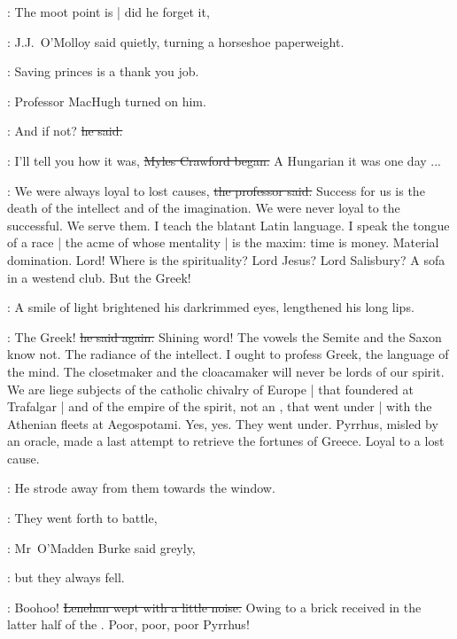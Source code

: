 \jjom:
The moot point is |
did he forget it,

:
J.J.~O'Molloy said quietly,
turning a horseshoe paperweight.

\jjom:
Saving princes is a thank you job.


:
Professor MacHugh turned on him.

\machugh:
And if not?
\sout{he said.}

\crawford:
I'll tell you how it was,
\sout{Myles Crawford began.}
A Hungarian it was one day
...



\machugh:
We were always loyal to lost causes,
\sout{the professor said.}
Success for us is the death of the intellect and of the imagination.
We were never loyal to the successful.
We serve them.
I teach the blatant Latin language.
I speak the tongue of a race |
the acme of whose mentality |
is the maxim:
time is money.
Material domination.
Lord!
Where is the spirituality?
Lord Jesus?
Lord Salisbury?
A sofa in a westend club.
But the Greek!



:
A smile of light brightened his darkrimmed eyes,
lengthened his long lips.

\machugh:
The Greek!
\sout{he said again.}
Shining word!
The vowels the Semite and the Saxon know not.
The radiance of the intellect.
I ought to profess Greek, the language of the mind.
The closetmaker and the cloacamaker will never be lords of our spirit.
We are liege subjects of the catholic chivalry of Europe |
that foundered at Trafalgar |
and of the empire of the spirit,
not an ,
that went under |
with the Athenian fleets at Aegospotami.
Yes, yes.
They went under.
Pyrrhus,
misled by an oracle,
made a last attempt to retrieve the fortunes of Greece.
Loyal to a lost cause.%

:
He strode away from them towards the window.

\omaddenburke:
They went forth to battle,

:
Mr~O'Madden Burke said greyly,

\omaddenburke:
but they always fell.

\lenehan:
Boohoo!
\sout{Lenehan wept with a little noise.}
Owing to a brick received in the latter half of the .
Poor, poor, poor Pyrrhus!

